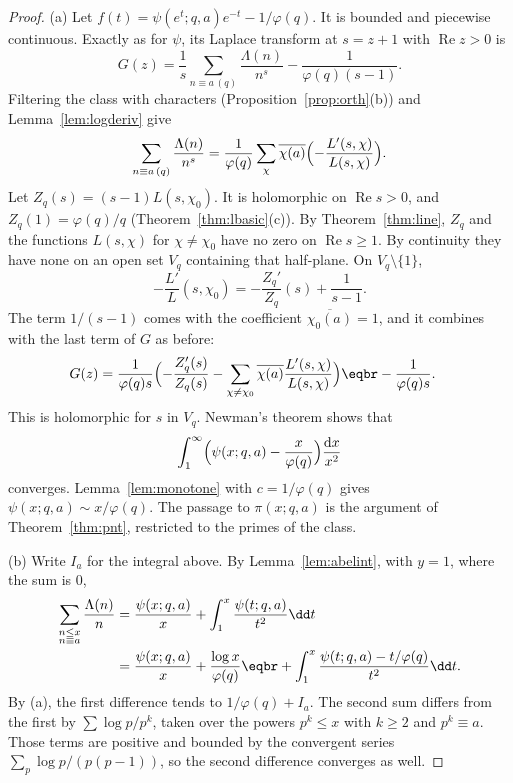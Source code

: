 \begin{proof}
(a) Let $f(t)=\psi(e^t;q,a)e^{-t}-1/\varphi(q)$. It is bounded and piecewise continuous. Exactly as for $\psi$, its Laplace transform at $s=z+1$ with $\operatorname{Re}z>0$ is
\[
G(z)=\frac1s\sum_{n\equiv a\,(q)}\frac{\Lambda(n)}{n^s}-\frac1{\varphi(q)(s-1)}.
\]
Filtering the class with characters (Proposition~\ref{prop:orth}(b)) and Lemma~\ref{lem:logderiv} give
\[
\sum_{n\equiv a\,(q)}\frac{\Lambda(n)}{n^s}=\frac1{\varphi(q)}\sum_\chi\overline{\chi(a)}\Bigl(-\frac{L'(s,\chi)}{L(s,\chi)}\Bigr).
\]
Let $Z_q(s)=(s-1)L(s,\chi_0)$. It is holomorphic on $\operatorname{Re}s>0$, and $Z_q(1)=\varphi(q)/q$ (Theorem~\ref{thm:lbasic}(c)). By Theorem~\ref{thm:line}, $Z_q$ and the functions $L(s,\chi)$ for $\chi\ne\chi_0$ have no zero on $\operatorname{Re}s\ge1$. By continuity they have none on an open set $V_q$ containing that half-plane. On $V_q\setminus\{1\}$,
\[
-\frac{L'}{L}(s,\chi_0)=-\frac{Z_q'}{Z_q}(s)+\frac1{s-1}.
\]
The term $1/(s-1)$ comes with the coefficient $\overline{\chi_0(a)}=1$, and it combines with the last term of $G$ as before:
\[
\begin{aligned}G(z)&=\frac1{\varphi(q)s}\Bigl(-\frac{Z_q'(s)}{Z_q(s)}-\sum_{\chi\ne\chi_0}\overline{\chi(a)}\frac{L'(s,\chi)}{L(s,\chi)}\Bigr)\eqbr-\frac1{\varphi(q)s}.\end{aligned}
\]
This is holomorphic for $s$ in $V_q$. Newman's theorem shows that
\[
\int_1^\infty\Bigl(\psi(x;q,a)-\frac x{\varphi(q)}\Bigr)\frac{\mathrm dx}{x^2}
\]
converges. Lemma~\ref{lem:monotone} with $c=1/\varphi(q)$ gives $\psi(x;q,a)\sim x/\varphi(q)$. The passage to $\pi(x;q,a)$ is the argument of Theorem~\ref{thm:pnt}, restricted to the primes of the class.

(b) Write $I_a$ for the integral above. By Lemma~\ref{lem:abelint}, with $y=1$, where the sum is $0$,
\[
\begin{aligned}\sum_{\substack{n\le x\\n\equiv a}}\frac{\Lambda(n)}n&=\frac{\psi(x;q,a)}x+\int_1^x\frac{\psi(t;q,a)}{t^2}\dd t\\&=\frac{\psi(x;q,a)}x+\frac{\log x}{\varphi(q)}\eqbr+\int_1^x\frac{\psi(t;q,a)-t/\varphi(q)}{t^2}\dd t.\end{aligned}
\]
By (a), the first difference tends to $1/\varphi(q)+I_a$. The second sum differs from the first by $\sum\log p/p^k$, taken over the powers $p^k\le x$ with $k\ge2$ and $p^k\equiv a$. Those terms are positive and bounded by the convergent series $\sum_p\log p/(p(p-1))$, so the second difference converges as well.
\end{proof}

